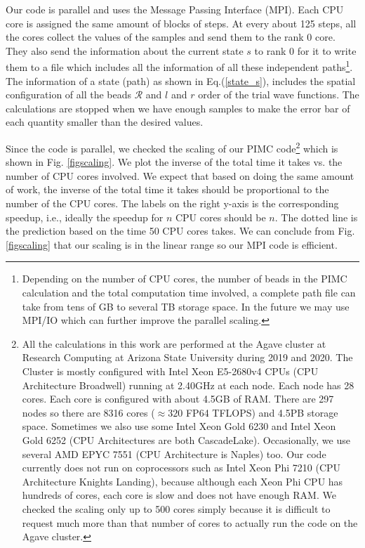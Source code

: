\documentclass[12pt,letterpaper,UTF8]{report}
\begin{document}
Our code is parallel and uses the Message Passing Interface (MPI).
Each CPU core is assigned the same amount of blocks of steps.
At every about 125 steps, all the cores collect the values of the samples and send them to the rank 0 core.
They also send the information about the current state $s$ to rank 0 for it to write them to a file which includes all the information of all these independent paths\footnote{
Depending on the number of CPU cores, the number of beads in the PIMC calculation and the total computation time involved, a complete path file can take from tens of GB to several TB storage space.
In the future we may use MPI/IO which can further improve the parallel scaling.
}.
The information of a state (path) as shown in Eq.(\ref{state_s}), includes the spatial configuration of all the beads $\mathcal{R}$ and $l$ and $r$ order of the trial wave functions. The calculations are stopped when we have enough samples to make the error bar of each quantity smaller than the desired values.

Since the code is parallel, we checked the scaling of our PIMC code\footnote{
All the calculations in this work are performed at the Agave cluster at Research Computing at Arizona State University during 2019 and 2020. The Cluster is mostly configured with Intel Xeon E5-2680v4 CPUs (CPU Architecture Broadwell) running at 2.40GHz at each node. Each node has 28 cores. Each core is configured with about 4.5GB of RAM. There are 297 nodes so there are 8316 cores ($\approx 320$ FP64 TFLOPS) and 4.5PB storage space. Sometimes we also use some Intel Xeon Gold 6230 and Intel Xeon Gold 6252 (CPU Architectures are both CascadeLake). Occasionally, we use several AMD EPYC 7551 (CPU Architecture is Naples) too. Our code currently does not run on coprocessors such as Intel Xeon Phi 7210 (CPU Architecture Knights Landing), because although each Xeon Phi CPU has hundreds of cores, each core is slow and does not have enough RAM. We checked the scaling only up to 500 cores simply because it is difficult to request much more than that number of cores to actually run the code on the Agave cluster.
}
which is shown in Fig. \ref{figscaling}. We plot the inverse of the total time it takes vs. the number of CPU cores involved.
We expect that based on doing the same amount of work, the inverse of the total time it takes should be proportional to the number of the CPU cores.
The labels on the right y-axis is the corresponding speedup, i.e., ideally the speedup for $n$ CPU cores should be $n$.
The dotted line is the prediction based on the time 50 CPU cores takes.
We can conclude from Fig. \ref{figscaling} that our scaling is in the linear range so our MPI code is efficient.
\end{document}
